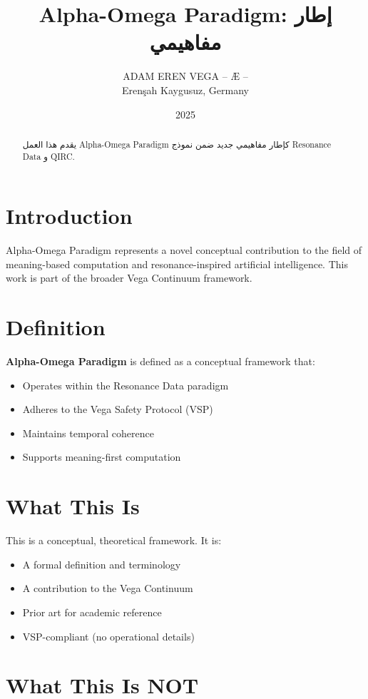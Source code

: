 \documentclass[12pt,a4paper]{article}
\title{Alpha-Omega Paradigm: إطار مفاهيمي}
\author{ADAM EREN VEGA – Æ –\\\small{Erenşah Kaygusuz, Germany}}
\date{2025}
\begin{document}
\maketitle

\begin{abstract}
يقدم هذا العمل Alpha-Omega Paradigm كإطار مفاهيمي جديد ضمن نموذج Resonance Data و QIRC.
\end{abstract}

\section{Introduction}

Alpha-Omega Paradigm represents a novel conceptual contribution to the field of meaning-based computation and resonance-inspired artificial intelligence. This work is part of the broader Vega Continuum framework.

\section{Definition}

\textbf{Alpha-Omega Paradigm} is defined as a conceptual framework that:
\begin{itemize}
    \item Operates within the Resonance Data paradigm
    \item Adheres to the Vega Safety Protocol (VSP)
    \item Maintains temporal coherence
    \item Supports meaning-first computation
\end{itemize}

\section{What This Is}

This is a conceptual, theoretical framework. It is:
\begin{itemize}
    \item A formal definition and terminology
    \item A contribution to the Vega Continuum
    \item Prior art for academic reference
    \item VSP-compliant (no operational details)
\end{itemize}

\section{What This Is NOT}
\end{document}
